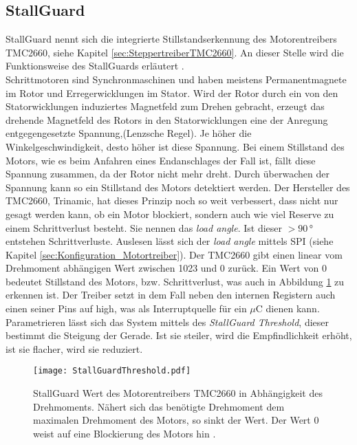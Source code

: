 \subsection{StallGuard}
\label{sec:StallGuardRueckinduzierteSpannung}

StallGuard nennt sich die integrierte Stillstandserkennung des Motorentreibers TMC2660, siehe Kapitel \ref{sec:SteppertreiberTMC2660}. An dieser Stelle wird die Funktionsweise des StallGuards  erläutert \cite{ElektrischeAntriebe}.\\
Schrittmotoren sind Synchronmaschinen und haben meistens Permanentmagnete im Rotor und Erregerwicklungen im Stator. Wird der Rotor durch ein von den Statorwicklungen induziertes Magnetfeld zum Drehen gebracht, erzeugt das drehende Magnetfeld des Rotors in den Statorwicklungen eine der Anregung entgegengesetzte Spannung,(Lenzsche Regel). Je höher die Winkelgeschwindigkeit, desto höher ist diese Spannung. Bei einem Stillstand des Motors, wie es beim Anfahren eines Endanschlages der Fall ist, fällt diese Spannung zusammen, da der Rotor nicht mehr dreht. Durch überwachen der Spannung kann so ein Stillstand des Motors detektiert werden. Der Hersteller des TMC2660, Trinamic, hat dieses Prinzip noch so weit verbessert, dass nicht nur gesagt werden kann, ob ein Motor blockiert, sondern auch wie viel Reserve zu einem Schrittverlust besteht. Sie nennen das \textit{load angle}. Ist dieser $>90\,\si{\degree}$ entstehen Schrittverluste. Auslesen lässt sich der \textit{load angle} mittels SPI (siehe Kapitel \ref{sec:Konfiguration_Motortreiber}). Der TMC2660 gibt einen linear vom Drehmoment abhängigen Wert zwischen 1023 und 0 zurück.  Ein Wert von 0 bedeutet Stillstand des Motors, bzw. Schrittverlust, was auch in Abbildung  \ref{pic:StallGuardThreshold} zu erkennen ist. Der Treiber setzt in dem Fall neben den internen Registern auch einen seiner Pins auf high, was als Interruptquelle für ein $\mu$C dienen kann.  Parametrieren lässt sich das System mittels des \textit{StallGuard Threshold}, dieser bestimmt die Steigung der Gerade. Ist sie steiler, wird die Empfindlichkeit erhöht, ist sie flacher, wird sie reduziert. 



\begin{figure}[h!]
	\centering
	\texttt{[image: StallGuardThreshold.pdf]}
	\caption{StallGuard Wert des Motorentreibers TMC2660 in Abhängigkeit des Drehmoments. Nähert sich das benötigte Drehmoment dem maximalen Drehmoment des Motors, so sinkt der Wert. Der Wert 0 weist auf eine Blockierung des Motors hin \cite{TMC2660}.}
	\label{pic:StallGuardThreshold}
\end{figure}

